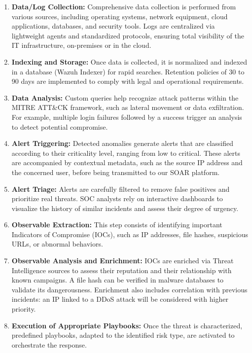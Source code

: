 \begin{enumerate}
    \item \textbf{Data/Log Collection:} Comprehensive data collection is performed from various sources, including operating systems, network equipment, cloud applications, databases, and security tools. Logs are centralized via lightweight agents and standardized protocols, ensuring total visibility of the IT infrastructure, on-premises or in the cloud.

    \item \textbf{Indexing and Storage:} Once data is collected, it is normalized and indexed in a database (Wazuh Indexer) for rapid searches. Retention policies of 30 to 90 days are implemented to comply with legal and operational requirements.

    \item \textbf{Data Analysis:} Custom queries help recognize attack patterns within the MITRE ATT\&CK framework, such as lateral movement or data exfiltration. For example, multiple login failures followed by a success trigger an analysis to detect potential compromise.

    \item \textbf{Alert Triggering:} Detected anomalies generate alerts that are classified according to their criticality level, ranging from low to critical. These alerts are accompanied by contextual metadata, such as the source IP address and the concerned user, before being transmitted to our SOAR platform.

    \item \textbf{Alert Triage:} Alerts are carefully filtered to remove false positives and prioritize real threats. SOC analysts rely on interactive dashboards to visualize the history of similar incidents and assess their degree of urgency.

    \item \textbf{Observable Extraction:} This step consists of identifying important Indicators of Compromise (IOCs), such as IP addresses, file hashes, suspicious URLs, or abnormal behaviors.

    \item \textbf{Observable Analysis and Enrichment:} IOCs are enriched via Threat Intelligence sources to assess their reputation and their relationship with known campaigns. A file hash can be verified in malware databases to validate its dangerousness. Enrichment also includes correlation with previous incidents: an IP linked to a DDoS attack will be considered with higher priority.

    \item \textbf{Execution of Appropriate Playbooks:} Once the threat is characterized, predefined playbooks, adapted to the identified risk type, are activated to orchestrate the response.
\end{enumerate}

